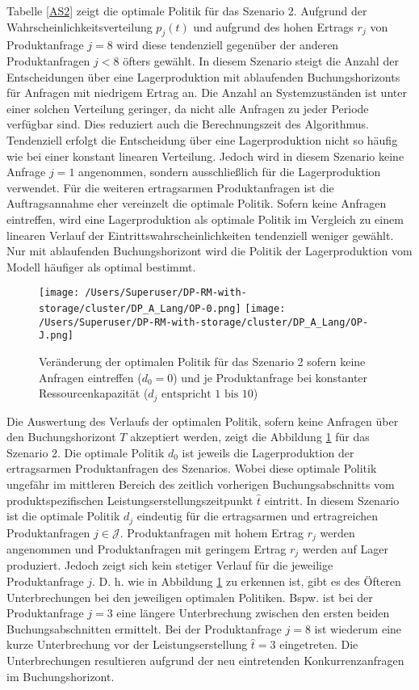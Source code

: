 Tabelle \ref{AS2} zeigt die optimale Politik für das Szenario 2. Aufgrund der Wahrscheinlichkeitsverteilung $p_j(t)$ und aufgrund des hohen Ertrags $r_j$ von Produktanfrage $j=8$ wird diese tendenziell gegenüber der anderen Produktanfragen $j<8$ öfters gewählt. In diesem Szenario steigt die Anzahl der Entscheidungen über eine Lagerproduktion mit ablaufenden Buchungshorizonts für Anfragen mit niedrigem Ertrag an. Die Anzahl an Systemzuständen ist unter einer solchen Verteilung geringer, da nicht alle Anfragen zu jeder Periode verfügbar sind. Dies reduziert auch die Berechnungszeit des Algorithmus. Tendenziell erfolgt die Entscheidung über eine Lagerproduktion nicht so häufig wie bei einer konstant linearen Verteilung. Jedoch wird in diesem Szenario keine Anfrage $j=1$ angenommen, sondern ausschließlich für die Lagerproduktion verwendet. Für die weiteren ertragsarmen Produktanfragen ist die Auftragsannahme eher vereinzelt die optimale Politik. Sofern keine Anfragen eintreffen, wird eine Lagerproduktion als optimale Politik im Vergleich zu einem linearen Verlauf der Eintrittswahrscheinlichkeiten tendenziell weniger gewählt. Nur mit ablaufenden Buchungshorizont wird die Politik der Lagerproduktion vom Modell häufiger als optimal bestimmt.

\begin{figure}[h!]     
\begin{center}
\texttt{[image: /Users/Superuser/DP-RM-with-storage/cluster/DP\_A\_Lang/OP-0.png]}
\texttt{[image: /Users/Superuser/DP-RM-with-storage/cluster/DP\_A\_Lang/OP-J.png]}
    \caption{Veränderung der optimalen Politik für das Szenario 2 sofern keine Anfragen eintreffen ($d_0=0$) und je Produktanfrage bei konstanter Ressourcenkapazität ($d_j\text{ entspricht }1\text{ bis }10$)}  \label{SV2}
  \end{center}
\end{figure}

Die Auswertung des Verlaufs der optimalen Politik, sofern keine Anfragen über den Buchungshorizont $T$ akzeptiert werden, zeigt die Abbildung \ref{SV2} für das Szenario 2. Die optimale Politik $d_0$ ist jeweils die Lagerproduktion der ertragsarmen Produktanfragen des Szenarios. Wobei diese optimale Politik ungefähr im mittleren Bereich des zeitlich vorherigen Buchungsabschnitts vom produktspezifischen Leistungserstellungszeitpunkt $\hat t$ eintritt. In diesem Szenario ist die optimale Politik $d_j$ eindeutig für die ertragsarmen und ertragreichen Produktanfragen $j\in\mathcal{J}$. Produktanfragen mit hohem Ertrag $r_j$ werden angenommen und Produktanfragen mit geringem Ertrag $r_j$ werden auf Lager produziert. Jedoch zeigt sich kein stetiger Verlauf für die jeweilige Produktanfrage $j$. D. h. wie in Abbildung \ref{SV2} zu erkennen ist, gibt es des Öfteren Unterbrechungen bei den jeweiligen optimalen Politiken. Bspw. ist bei der Produktanfrage $j=3$ eine längere Unterbrechung zwischen den ersten beiden Buchungsabschnitten ermittelt. Bei der Produktanfrage $j=8$ ist wiederum eine kurze Unterbrechung vor der Leistungserstellung $\hat t = 3$ eingetreten. Die Unterbrechungen resultieren aufgrund der neu eintretenden Konkurrenzanfragen im Buchungshorizont.\\[.5cm]

